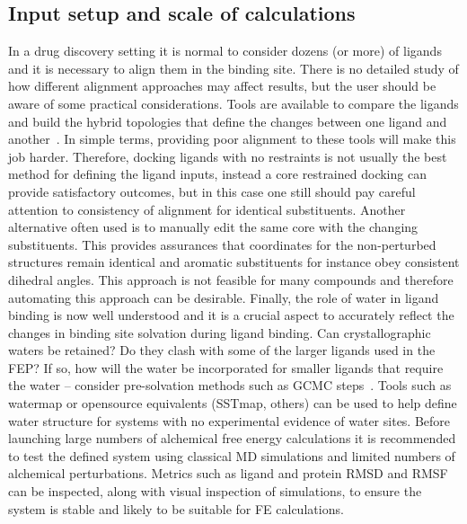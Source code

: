 \documentclass[9pt,bestpractices]{livecoms}
\begin{document}
\subsection*{Input setup and scale of calculations}
In a drug discovery setting it is normal to consider dozens (or more) of ligands and it is necessary to align them in the binding site. There is no detailed study of how different alignment approaches may affect results, but the user should be aware of some practical considerations. Tools are available to compare the ligands and build the hybrid topologies that define the changes between one ligand and another~\cite{loeffler2015fesetup,hedges2019biosimspace,gapsys2015pmx}. In simple terms, providing poor alignment to these tools will make this job harder. Therefore, docking ligands with no restraints is not usually the best method for defining the ligand inputs, instead a core restrained docking can provide satisfactory outcomes, but in this case one still should pay careful attention to consistency of alignment for identical substituents. Another alternative often used is to manually edit the same core with the changing substituents. This provides assurances that coordinates for the non-perturbed structures remain identical and aromatic substituents for instance obey consistent dihedral angles. This approach is not feasible for many compounds and therefore automating this approach can be desirable. Finally, the role of water in ligand binding is now well understood and it is a crucial aspect to accurately reflect the changes in binding site solvation during ligand binding. Can crystallographic waters be retained? Do they clash with some of the larger ligands used in the FEP? If so, how will the water be incorporated for smaller ligands that require the water – consider pre-solvation methods such as GCMC steps~\cite{michel2010prediction}. Tools such as watermap or opensource equivalents (SSTmap, others) can be used to help define water structure for systems with no experimental evidence of water sites. Before launching large numbers of alchemical free energy calculations it is recommended to test the defined system using classical MD simulations and limited numbers of alchemical perturbations. Metrics such as ligand and protein RMSD and RMSF can be inspected, along with visual inspection of simulations, to ensure the system is stable and likely to be suitable for FE calculations. 
%
\end{document}
